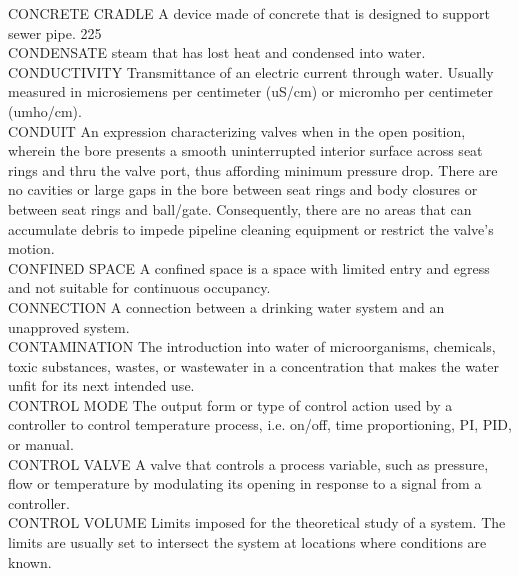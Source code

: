 CONCRETE CRADLE
A device made of concrete that is designed to support sewer pipe. 225 
\vspace{0.3cm}\\
CONDENSATE
steam that has lost heat and condensed into water.
\vspace{0.3cm}\\
CONDUCTIVITY
Transmittance of an electric current through water. Usually measured in microsiemens per centimeter (uS/cm) or micromho per centimeter (umho/cm).
\vspace{0.3cm}\\
CONDUIT
An expression characterizing valves when in the open position, wherein the bore presents a smooth uninterrupted interior surface across seat rings and thru the valve port, thus affording minimum pressure drop. There are no cavities or large gaps in the bore between seat rings and body closures or between seat rings and ball/gate. Consequently, there are no areas that can accumulate debris to impede pipeline cleaning equipment or restrict the valve's motion.
\vspace{0.3cm}\\


CONFINED SPACE
A confined space is a space with limited entry and egress and not suitable for continuous occupancy.
\vspace{0.3cm}\\
CONNECTION
A connection between a drinking water system and an unapproved system.
\vspace{0.3cm}\\
CONTAMINATION
The introduction into water of microorganisms, chemicals, toxic substances, wastes, or wastewater in a concentration that makes the water unfit for its next intended use.
\vspace{0.3cm}\\

CONTROL MODE
The output form or type of control action used by a controller to control temperature process, i.e. on/off, time proportioning, PI, PID, or manual.
\vspace{0.3cm}\\

CONTROL VALVE
A valve that controls a process variable, such as pressure, flow or temperature by modulating its opening in response to a signal from a controller.
\vspace{0.3cm}\\
CONTROL VOLUME
Limits imposed for the theoretical study of a system. The limits are usually set to intersect the system at locations where conditions are known.
\vspace{0.3cm}\\

